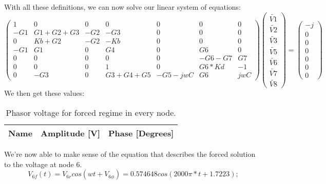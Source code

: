 With all these definitions, we can now solve our linear system of equations:
\begin{equation}
\begin{pmatrix}
1 & 0 & 0 & 0 & 0 & 0 & 0\\
-G1 & G1+G2+G3 & -G2 & -G3 & 0 & 0 & 0\\
0 & Kb+G2 & -G2 & -Kb & 0 & 0 & 0\\
-G1 & G1 & 0 & G4 & 0 & G6 & 0\\
0 & 0 & 0 & 0 & 0 & -G6-G7 & G7\\
0 & 0 & 0 & 1 & 0 & G6*Kd & -1\\
0 & -G3 & 0 & G3+G4+G5 & -G5-jwC & G6 & jwC
\end{pmatrix}
\begin{pmatrix}
\tilde{V1}\\
\tilde{V2}\\
\tilde{V3}\\
\tilde{V5}\\
\tilde{V6}\\
\tilde{V7}\\
\tilde{V8}
\end{pmatrix}
=
\begin{pmatrix}
-j\\
0\\
0\\
0\\
0\\
0\\
0
\end{pmatrix}
\end{equation}
We then get these values:
\begin{table}[h]
  \centering
  \begin{tabular}{|l|r|r|}
    \hline    
    {\bf Name} & {\bf Amplitude [V]} & {\bf Phase [Degrees]}\\ \hline
     
  \end{tabular}
  \caption{Phasor voltage for forced regime in every node.}
  \label{tab:phasor}
\end{table} \par
We're now able to make sense of the equation that describes the forced solution to the voltage at node 6.
\begin{equation}
V_{6f}(t)=V_{6r}cos(wt+V_{6\phi})=0.574648cos(2000\pi*t+1.7223);
\end{equation}
